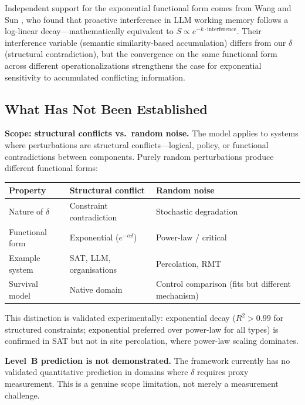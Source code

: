 \documentclass[11pt,a4paper]{article}
\begin{document}
Independent support for the exponential functional form comes from Wang and Sun \citep{wang2025interference}, who found that proactive interference in LLM working memory follows a log-linear decay---mathematically equivalent to $S \propto e^{-k \cdot \text{interference}}$. Their interference variable (semantic similarity-based accumulation) differs from our $\delta$ (structural contradiction), but the convergence on the same functional form across different operationalizations strengthens the case for exponential sensitivity to accumulated conflicting information.

\subsection{What Has Not Been Established}

\textbf{Scope: structural conflicts vs.\ random noise.} The model applies to systems where perturbations are structural conflicts---logical, policy, or functional contradictions between components. Purely random perturbations produce different functional forms:

\begin{center}
\small
\begin{tabular}{lll}
\toprule
\textbf{Property} & \textbf{Structural conflict} & \textbf{Random noise} \\
\midrule
Nature of $\delta$ & Constraint contradiction & Stochastic degradation \\
Functional form & Exponential ($e^{-\alpha\delta}$) & Power-law / critical \\
Example system & SAT, LLM, organisations & Percolation, RMT \\
Survival model & Native domain & Control comparison (fits but different mechanism) \\
\bottomrule
\end{tabular}
\end{center}

This distinction is validated experimentally: exponential decay ($R^2 > 0.99$ for structured constraints; exponential preferred over power-law for all types) is confirmed in SAT but not in site percolation, where power-law scaling dominates.

\textbf{Level~B prediction is not demonstrated.} The framework currently has no validated quantitative prediction in domains where $\delta$ requires proxy measurement. This is a genuine scope limitation, not merely a measurement challenge.
\end{document}
